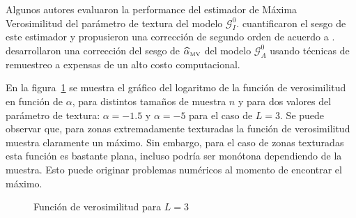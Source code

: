 Algunos autores evaluaron la performance del estimador de Máxima Verosimilitud del parámetro de textura del modelo  $\mathcal G_I^0$. \citet{VasconcellosFrerySilva:CompStat} cuantificaron el sesgo de este estimador y propusieron una corrección de segundo orden de acuerdo a \citet{cox1968}. 
\citet{CribariFrerySilva:CSDA} desarrollaron una corrección del sesgo de $\widehat{\alpha}_{\text{{\text{\tiny{MV}}}}}$ del modelo $\mathcal G^0_A$ usando técnicas de remuestreo a expensas de un alto costo computacional.

En la figura~\ref{MV} se muestra el gráfico del logaritmo de la función de verosimilitud en función de $\alpha$, para distintos tamaños de muestra $n$ y para dos valores del parámetro de textura: $\alpha=-1.5$ y $\alpha=-5$ para el caso de $L=3$. Se puede observar que, para zonas extremadamente texturadas la función de verosimilitud muestra claramente un máximo. Sin embargo, para el caso de zonas texturadas esta función es bastante plana, incluso podría ser monótona dependiendo de la muestra. Esto puede originar problemas numéricos al momento de encontrar el máximo.  

\begin{figure}[hbt]
	\centering    
	 \qquad
	\caption{\label{MV} Función de verosimilitud para $L=3$}
\end{figure}

